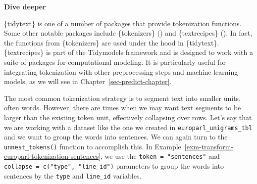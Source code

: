 \documentclass[
  letterpaper,
  krantz1]{latex/krantz-mod}
\theoremstyle{definition}
\theoremstyle{definition}
\theoremstyle{remark}
\begin{document}
\begin{tcolorbox}[enhanced jigsaw, toprule=.15mm, breakable, colback=white, arc=.35mm, left=2mm, colframe=quarto-callout-color-frame, opacityback=0, bottomrule=.15mm, rightrule=.15mm, leftrule=.75mm]

\textbf{ Dive deeper}

\{tidytext\} is one of a number of packages that provide tokenization
functions. Some other notable packages include \{tokenizers\}
()
and \{textrecipes\} (). In fact, the functions from
\{tokenizers\} are used under the hood in \{tidytext\}. \{textrecipes\}
is part of the Tidymodels framework and is designed to
work with a suite of packages for computational modeling. It is
particularly useful for integrating tokenization with other
preprocessing steps and machine learning models,
as we will see in Chapter~\ref{sec-predict-chapter}.

\end{tcolorbox}

The most common tokenization strategy is to segment text into smaller
units, often words. However, there are times when we may want text
segments to be larger than the existing token unit, effectively
collapsing over rows. Let's say that we are working with a dataset like
the one we created in \texttt{europarl\_unigrams\_tbl} and we want to
group the words into sentences. We can again turn to the
\texttt{unnest\_tokens()} function to accomplish this. In
Example~\ref{exm-transform-europarl-tokenization-sentences}, we use the
\texttt{token\ =\ "sentences"} and
\texttt{collapse\ =\ c("type",\ "line\_id")} parameters to group the
words into sentences by the \texttt{type} and \texttt{line\_id}
variables.
\end{document}
